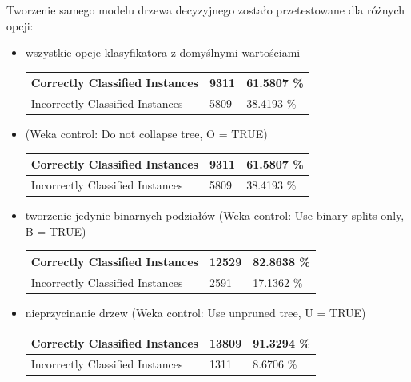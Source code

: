 \documentclass[11pt]{article} %
\begin{document}
Tworzenie samego modelu drzewa decyzyjnego zostało przetestowane dla różnych opcji:
\begin{itemize}
\item wszystkie opcje klasyfikatora z domyślnymi wartościami

\begin{center}
    \begin{tabular}{ | l | l | l | }
    \hline
    	Correctly Classified Instances & 9311 & 61.5807 \% \\ \hline
	Incorrectly Classified Instances & 5809 & 38.4193 \% \\ \hline
    \end{tabular}
\end{center}

\item (Weka control: Do not collapse tree, O = TRUE)

\begin{center}
    \begin{tabular}{ | l | l | l | }
    \hline
    	Correctly Classified Instances & 9311 & 61.5807 \% \\ \hline
	Incorrectly Classified Instances & 5809 & 38.4193 \% \\ \hline
    \end{tabular}
\end{center}

\item tworzenie jedynie binarnych podziałów (Weka control: Use binary splits only, B = TRUE)

\begin{center}
    \begin{tabular}{ | l | l | l | }
    \hline
    	Correctly Classified Instances & 12529 & 82.8638 \% \\ \hline
	Incorrectly Classified Instances & 2591 & 17.1362 \% \\ \hline
    \end{tabular}
\end{center}

\item nieprzycinanie drzew (Weka control: Use unpruned tree, U = TRUE)

\begin{center}
    \begin{tabular}{ | l | l | l | }
    \hline
    	Correctly Classified Instances & 13809 & 91.3294 \% \\ \hline
	Incorrectly Classified Instances & 1311 & 8.6706 \% \\ \hline
    \end{tabular}
\end{center}

\end{itemize}
\end{document}
